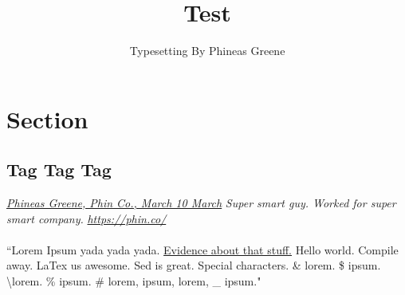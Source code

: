 \documentclass{article}
\author{Typesetting By Phineas Greene}
\title{Test}
\begin{document}
\maketitle
\tableofcontents
\newpage

\section{Section}
\subsection{Tag Tag Tag}
\textit{\ul{Phineas Greene, Phin Co., March 10 March}}
\textit{Super smart guy. Worked for super smart company.}
\textit{\url{https://phin.co/}}
\paragraph{}``Lorem Ipsum yada yada yada. \ul{Evidence about that stuff.} Hello world. Compile away. LaTex us awesome. Sed is great. Special characters. \& lorem. \$ ipsum. \textbackslash  lorem. \% ipsum. \# lorem, { ipsum, } lorem, \_ ipsum."
\end{document}
